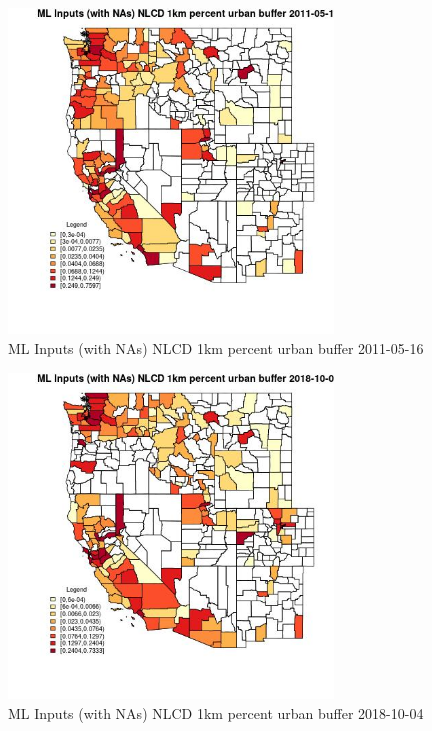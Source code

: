 \begin{figure} 
\centering  
\includegraphics[width=0.77\textwidth]{Code_Outputs/Report_ML_input_PM25_Step4_part_f_de_duplicated_aves_prioritize_24hr_obswNAs_CountyNLCD_1km_percent_urban_bufferMean2011-05-16.jpg} 
\caption{\label{fig:Report_ML_input_PM25_Step4_part_f_de_duplicated_aves_prioritize_24hr_obswNAsCountyNLCD_1km_percent_urban_bufferMean2011-05-16}ML Inputs (with NAs) NLCD 1km percent urban buffer 2011-05-16} 
\end{figure} 
 

\begin{figure} 
\centering  
\includegraphics[width=0.77\textwidth]{Code_Outputs/Report_ML_input_PM25_Step4_part_f_de_duplicated_aves_prioritize_24hr_obswNAs_CountyNLCD_1km_percent_urban_bufferMean2018-10-04.jpg} 
\caption{\label{fig:Report_ML_input_PM25_Step4_part_f_de_duplicated_aves_prioritize_24hr_obswNAsCountyNLCD_1km_percent_urban_bufferMean2018-10-04}ML Inputs (with NAs) NLCD 1km percent urban buffer 2018-10-04} 
\end{figure} 
 

